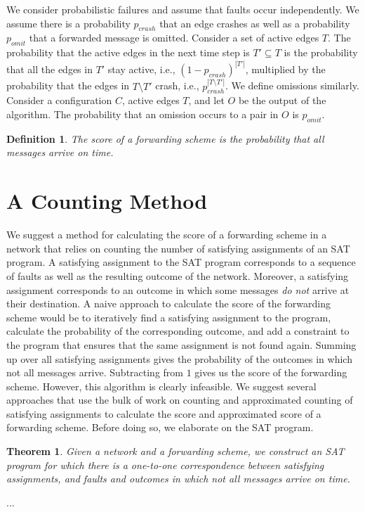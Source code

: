 \documentclass[11pt,eepic]{article}
\newtheorem{theorem}{Theorem}[section]
\newtheorem{definition}{Definition}[section]
\def\eod{\vrule height 6pt width 5pt depth 0pt}
\newenvironment{proof}{\noindent {\bf Proof:} \hspace{.677em}}
	                      {\hspace*{\fill}{\eod}}
\begin{document}
		We consider probabilistic failures and assume that faults occur independently. We assume there is a probability $p_{crash}$ that an edge crashes as well as a probability $p_{omit}$ that a forwarded message is omitted. Consider a set of active edges $T$. The probability that the active edges in the next time step is $T' \subseteq T$ is the probability that all the edges in $T'$ stay active, i.e., $(1-p_{crash})^{|T'|}$, multiplied by the probability that the edges in $T \setminus T'$ crash, i.e., $p_{crash}^{|T \setminus T'|}$. We define omissions similarly. Consider a configuration $C$, active edges $T$, and let $O$ be the output of the algorithm. The probability that an omission occurs to a pair in $O$ is $p_{omit}$. 

		\begin{definition}
		The score of a forwarding scheme is the probability that all messages arrive on time.
		\end{definition}





\section{A Counting Method}
\label{sec:counting}
	We suggest a method for calculating the score of a forwarding scheme in a network that relies on counting the number of satisfying assignments of an SAT program. A satisfying assignment to the SAT program corresponds to a sequence of faults as well as the resulting outcome of the network. Moreover, a satisfying assignment corresponds to an outcome in which some messages {\em do not} arrive at their destination. A naive approach to calculate the score of the forwarding scheme would be to iteratively find a satisfying assignment to the program, calculate the probability of the corresponding outcome, and add a constraint to the program that ensures that the same assignment is not found again. Summing up over all satisfying assignments gives the probability of the outcomes in which not all messages arrive. Subtracting from $1$ gives us the score of the forwarding scheme. However, this algorithm is clearly infeasible. We suggest several approaches that use the bulk of work on counting and approximated counting of satisfying assignments to calculate the score and approximated score of a forwarding scheme. Before doing so, we elaborate on the SAT program.

	\begin{theorem}
	\label{thm:fault seq}
	Given a network and a forwarding scheme, we construct an SAT program for which there is a one-to-one correspondence between satisfying assignments, and faults and outcomes in which not all messages arrive on time.
	\end{theorem}
	\begin{proof}
	...
	\end{proof}
\end{document}

